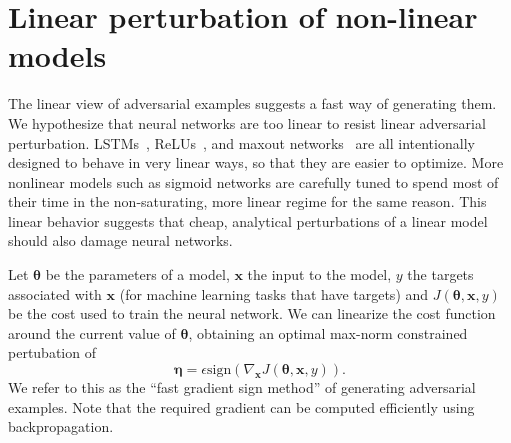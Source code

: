 \documentclass{article} %
\def\eps{{\epsilon}}
\def\sign{{\text{sign}}}
\def\veta{{\bm{\eta}}}
\def\vtheta{{\bm{\theta}}}
\def\vx{{\bm{x}}}
\begin{document}

\section{Linear perturbation of non-linear models}

The linear view of adversarial examples suggests a fast way of generating them.
We hypothesize that neural networks are too linear to resist linear adversarial
perturbation.
LSTMs~\citep{lstm}, ReLUs~\citep{Jarrett-ICCV2009,Glorot+al-AI-2011},
and maxout networks~\citep{Goodfellow-et-al-ICML2013} are all intentionally
designed to behave in very linear ways, so that they are easier to optimize.
More nonlinear models such as sigmoid networks are carefully tuned to spend
most of their time in the non-saturating, more linear regime for the same reason.
This linear behavior suggests that cheap, analytical perturbations of a linear model
should also damage neural networks.

Let $\vtheta$ be the parameters of a model, $\vx$ the input to the model, $y$ the targets associated with
$\vx$ (for machine learning tasks that have targets) and $J(\vtheta, \vx, y)$ be the cost used to train the
neural network. We can linearize the cost function around the current value of $\vtheta$, obtaining
an optimal max-norm constrained pertubation of
\[ \veta = \eps \sign \left( \nabla_\vx J(\vtheta, \vx, y) \right). \]
We refer to this as the ``fast gradient sign method'' of generating adversarial examples.
Note that the required gradient can be computed efficiently using backpropagation.
\end{document}
